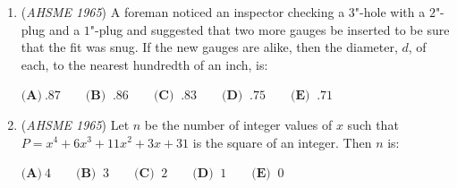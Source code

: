 \begin{enumerate}
 $\textbf{(A)}\ \frac {2mn}{m + n} \qquad  \textbf{(B) }\ \frac {1}{2(m + n)} \qquad  \textbf{(C) }\ \frac{1}{m+n-mn}\qquad \textbf{(D) }\ \frac{1-mn}{m+n+2mn}\qquad \textbf{(E) }\ \frac{m+n+2}{mn-1}$


	\item (\textit{AHSME 1965}) A foreman noticed an inspector checking a $3$"-hole with a $2$"-plug and a $1$"-plug and suggested that two more gauges 
be inserted to be sure that the fit was snug. If the new gauges are alike, then the diameter, $d$, of each, to the nearest hundredth of an inch, is: 


 $\textbf{(A)}\ .87 \qquad  \textbf{(B) }\ .86 \qquad  \textbf{(C) }\ .83 \qquad  \textbf{(D) }\ .75 \qquad  \textbf{(E) }\ .71$


	\item (\textit{AHSME 1965}) Let $n$ be the number of integer values of $x$ such that $P = x^4 + 6x^3 + 11x^2 + 3x + 31$ is the square of an integer. Then $n$ is: 


 $\textbf{(A)}\ 4 \qquad  \textbf{(B) }\ 3 \qquad  \textbf{(C) }\ 2 \qquad  \textbf{(D) }\ 1 \qquad  \textbf{(E) }\ 0$


\end{enumerate}